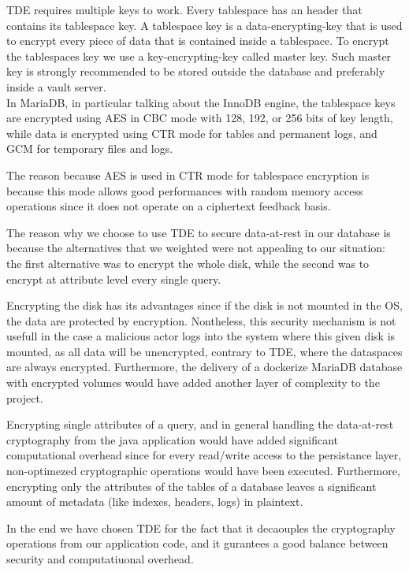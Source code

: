 TDE requires multiple keys to work. Every tablespace has an header that contains its tablespace key. A tablespace key is a data-encrypting-key that is used to encrypt every piece of data that is contained inside a tablespace. To encrypt the tablespaces key we use a key-encrypting-key called master key. Such master key is strongly recommended to be stored outside the database and preferably inside a vault server.\\ In MariaDB, in particular talking about the InnoDB engine, the tablespace keys are encrypted using AES in CBC mode with 128, 192, or 256 bits of key length, while data is encrypted using CTR mode for tables and permanent logs, and GCM for temporary files and logs.

The reason because AES is used in CTR mode for tablespace encryption is because this mode allows good performances with random memory access operations since it does not operate on a ciphertext feedback basis.

The reason why we choose to use TDE to secure data-at-rest in our database is because the alternatives that we weighted were not appealing to our situation: the first alternative was to encrypt the whole disk, while the second was to encrypt at attribute level every single query. 

Encrypting the disk has its advantages since if the disk is not mounted in the OS, the data are protected by encryption. Nontheless, this security mechanism is not usefull in the case a malicious actor logs into the system where this given disk is mounted, as all data will be unencrypted, contrary to TDE, where the dataspaces are always encrypted. Furthermore, the delivery of a dockerize MariaDB database with encrypted volumes would have added another layer of complexity to the project.

Encrypting single attributes of a query, and in general handling the data-at-rest cryptography from the java application would have added significant computational overhead since for every read/write access to the persistance layer, non-optimezed cryptographic operations would have been executed. Furthermore, encrypting only the attributes of the tables of a database leaves a significant amount of metadata (like indexes, headers, logs) in plaintext.

In the end we have chosen TDE for the fact that it decaouples the cryptography operations from our application code, and it gurantees a good balance between security and computatiuonal overhead.

